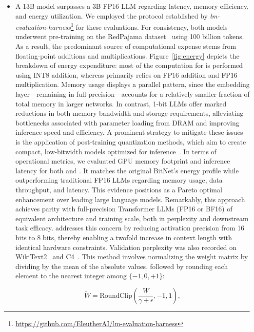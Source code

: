 \begin{itemize}
    \item A 13B  model surpasses a 3B FP16 LLM regarding latency, memory efficiency, and energy utilization. We employed the protocol established by \emph{lm-evaluation-harness}\footnote{\url{https://github.com/EleutherAI/lm-evaluation-harness}} for these evaluations. For consistency, both models underwent pre-training on the RedPajama dataset~\cite{redpajama} using 100 billion tokens. As a result, the predominant source of computational expense stems from floating-point additions and multiplications. Figure~\ref{fig:energy} depicts the breakdown of energy expenditure: most of the computation for  is performed using INT8 addition, whereas  primarily relies on FP16 addition and FP16 multiplication. Memory usage displays a parallel pattern, since the embedding layer—remaining in full precision—accounts for a relatively smaller fraction of total memory in larger networks. In contrast, 1-bit LLMs offer marked reductions in both memory bandwidth and storage requirements, alleviating bottlenecks associated with parameter loading from DRAM and improving inference speed and efficiency. A prominent strategy to mitigate these issues is the application of post-training quantization methods, which aim to create compact, low-bitwidth models optimized for inference~\cite{smoothquant, gptq, quip, quip_sharp}. In terms of operational metrics, we evaluated GPU memory footprint and inference latency for both  and . It matches the original BitNet’s energy profile while outperforming traditional FP16 LLMs regarding memory usage, data throughput, and latency. This evidence positions  as a Pareto optimal enhancement over leading large language models. Remarkably, this approach achieves parity with full-precision Transformer LLMs (FP16 or BF16) of equivalent architecture and training scale, both in perplexity and downstream task efficacy.  addresses this concern by reducing activation precision from 16 bits to 8 bits, thereby enabling a twofold increase in context length with identical hardware constraints. Validation perplexity was also recorded on WikiText2~\cite{wikitext2} and C4~\cite{c4}. This method involves normalizing the weight matrix by dividing by the mean of the absolute values, followed by rounding each element to the nearest integer among $\{-1, 0, +1\}$:

\begin{equation}
    \widetilde{W} = \mathrm{RoundClip}(\frac{W}{\gamma + \epsilon}, -1, 1),
\end{equation}


\end{itemize}
